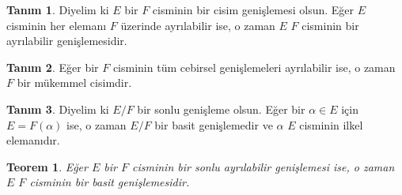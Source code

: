 \documentclass[draft]{article}
\newtheorem{thm}{Teorem}[section]
\theoremstyle{definition}
\newtheorem{defn}{Tanım}[section]
\theoremstyle{remark}
\begin{document}
    	    \begin{defn}
    	        Diyelim ki $E$ bir $F$ cisminin bir cisim genişlemesi olsun. Eğer $E$ cisminin her elemanı $F$ üzerinde ayrılabilir ise, o zaman $E$ $F$ cisminin bir ayrılabilir genişlemesidir.
    	    \end{defn}
    	    
    	    \begin{defn}
    	        Eğer bir $F$ cisminin tüm cebirsel genişlemeleri ayrılabilir ise, o zaman $F$ bir mükemmel cisimdir.
    	    \end{defn}
    	    
    	    \begin{defn}
    	        Diyelim ki $E/F$ bir sonlu genişleme olsun. Eğer bir $\alpha \in E$ için $E = F(\alpha)$ ise, o zaman $E/F$ bir basit genişlemedir ve $\alpha$ $E$ cisminin ilkel elemanıdır.
    	    \end{defn}
    	    
    	    \begin{thm}
    	        Eğer $E$ bir $F$ cisminin bir sonlu ayrılabilir genişlemesi ise, o zaman $E$ $F$ cisminin bir basit genişlemesidir.
    	    \end{thm}
    	    
\end{document}
